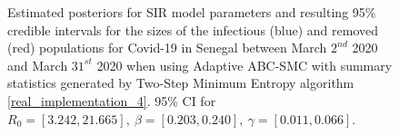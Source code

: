 \documentclass[11pt,a4paper]{article}
\theoremstyle{break}
\begin{document}
  \begin{figure}[H]
    \centering
    \caption{Estimated posteriors for SIR model parameters and resulting 95\% credible intervals for the sizes of the infectious (blue) and removed (red) populations for Covid-19 in Senegal between March $2^{nd}$ 2020 and March $31^{st}$ 2020 when using Adaptive ABC-SMC with summary statistics generated by Two-Step Minimum Entropy algorithm \ref{real_implementation_4}. 95\% CI for $R_0=[3.242,21.665],\ \beta=[0.203,0.240],\ \gamma=[0.011,0.066]$.}
    \label{fig_senegal_2_me}
  \end{figure}
\end{document}
